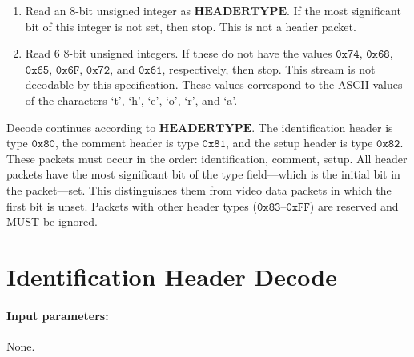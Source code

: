 \documentclass[9pt,letterpaper]{book}
\newcommand{\bitvar}[1]{\ensuremath{\mathbf{\bm{#1}}}}
\newcommand{\hex}[1]{\ensuremath{\mathtt{0x#1}}}
\numberwithin{equation}{chapter}
\numberwithin{figure}{chapter}
\numberwithin{table}{chapter}
\begin{document}
\begin{enumerate}
\item
Read an 8-bit unsigned integer as \bitvar{HEADERTYPE}.
If the most significant bit of this integer is not set, then stop.
This is not a header packet.
\item
Read 6 8-bit unsigned integers.
If these do not have the values \hex{74}, \hex{68}, \hex{65}, \hex{6F},
 \hex{72}, and \hex{61}, respectively, then stop.
This stream is not decodable by this specification.
These values correspond to the ASCII values of the characters `t', `h', `e',
 `o', `r', and `a'.
\end{enumerate}

Decode continues according to \bitvar{HEADERTYPE}.
The identification header is type \hex{80}, the comment header is type
 \hex{81}, and the setup header is type \hex{82}.
These packets must occur in the order: identification, comment, setup.
All header packets have the most significant bit of the type
 field---which is the initial bit in the packet---set.
This distinguishes them from video data packets in which the first bit
 is unset.
Packets with other header types (\hex{83}--\hex{FF}) are reserved and MUST be
 ignored.

\section{Identification Header Decode}
\label{sec:idheader}

\paragraph{Input parameters:} None.
\end{document}
